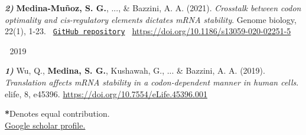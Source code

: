 \begin{cventries}
{\begin{cvitems}
{\begin{flushleft}
              \textit{\textbf{2)}} \textbf{Medina-Muñoz, S. G.}, ..., \& Bazzini, A. A. (2021).
              \textit{Crosstalk between codon optimality and cis-regulatory elements dictates mRNA stability}. Genome biology, 22(1), 1-23.
              \texttt{
              \href{https://github.com/santiago1234/MZT-rna-stability}{GitHub repository}
              }
              \linebreak
              \url{https://doi.org/10.1186/s13059-020-02251-5}
            \end{flushleft}
          }
      \end{cvitems}
    }
  \cventry
    {$\;$}
    {2019}
    {$\;$}
    {$\;$}
    {
      \begin{cvitems} %
        \item {
          \begin{flushleft}
            \textit{\textbf{1)}} Wu, Q., \textbf{Medina, S. G.}, Kushawah, G., ... \& Bazzini, A. A. (2019).
            \textit{Translation affects mRNA stability in a codon-dependent manner in human cells}.
            elife, 8, e45396.\linebreak
            \url{https://doi.org/10.7554/eLife.45396.001}
          \end{flushleft}
        }
      \end{cvitems}
    }


\end{cventries}

{\footnotesize \textbf{*}Denotes equal contribution.}\\
{\footnotesize \href{https://scholar.google.com/citations?user=XW3Sz1kAAAAJ&hl=es&oi=sra}{Google scholar profile.}}\\
\\
